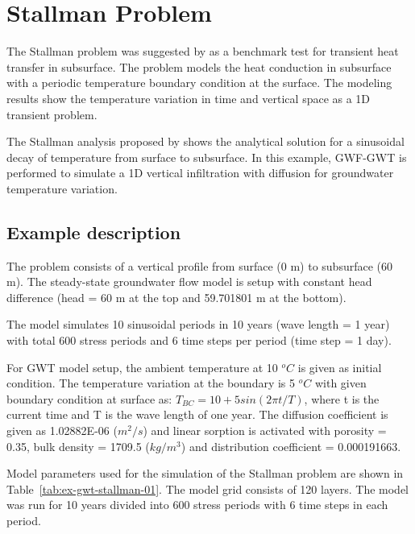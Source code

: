 \section{Stallman Problem}

The Stallman problem was suggested by \cite{stallman1965steady} as a benchmark test for transient heat transfer in subsurface. The problem models the heat conduction in subsurface with a periodic temperature boundary condition at the surface. The modeling results show the temperature variation in time and vertical space as a 1D transient problem.

The Stallman analysis proposed by \cite{stallman1965steady} shows the analytical solution for a sinusoidal decay of temperature from surface to subsurface. In this example, \mf GWF-GWT is performed to simulate a 1D vertical infiltration with diffusion for groundwater temperature variation.

\subsection{Example description}

 The problem consists of a vertical profile from surface (0 m) to subsurface (60 m). The steady-state groundwater flow model is setup with constant head difference (head = 60 m at the top and 59.701801 m at the bottom).

 The model simulates 10 sinusoidal periods in 10 years (wave length = 1 year) with total 600 stress periods and 6 time steps per period (time step = 1 day).

 For GWT model setup, the ambient temperature at 10 $^o C$ is given as initial condition. The temperature variation at the boundary is 5 $^o C$ with given boundary condition at surface as:
 $T_{BC} = 10+5sin(2\pi t/T)$, where t is the current time and T is the wave length of one year.
 The diffusion coefficient is given as 1.02882E-06 ($m^2/s$) and linear sorption is activated with porosity = 0.35, bulk density = 1709.5 ($kg/m^3$) and distribution coefficient = 0.000191663.

Model parameters used for the \mf simulation of the Stallman problem are shown in Table~\ref{tab:ex-gwt-stallman-01}. The model grid consists of 120 layers. The \mf model was run for 10 years divided into 600 stress periods with 6 time steps in each period.



